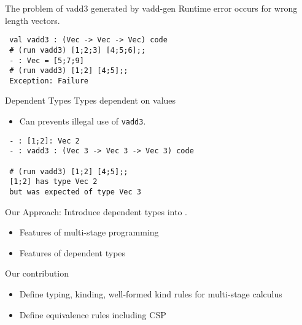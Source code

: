 \documentclass[dvipdfmx,aspectratio=169, 20pt]{beamer}
\begin{document}
\begin{frame}[fragile]{The problem of vadd3 generated by vadd-gen}
    Runtime error occurs for wrong length vectors.
    \begin{verbatim}
 val vadd3 : (Vec -> Vec -> Vec) code
 # (run vadd3) [1;2;3] [4;5;6];;
 - : Vec = [5;7;9]
 # (run vadd3) [1;2] [4;5];;
 Exception: Failure
    \end{verbatim}
    \note{
    }
\end{frame}

\begin{frame}[fragile]{Dependent Types}
    \renewcommand{\V}{\text{Vec}\ }
    Types dependent on values
    \begin{itemize}
        \item Can prevents illegal use of {\verb|vadd3|}.
    \end{itemize}
 \begin{verbatim}
 - : [1;2]: Vec 2
 - : vadd3 : (Vec 3 -> Vec 3 -> Vec 3) code

 # (run vadd3) [1;2] [4;5];;
 [1;2] has type Vec 2
 but was expected of type Vec 3
 \end{verbatim}
\end{frame}


\begin{frame}[fragile]{Our Approach: \LMD}
    Introduce dependent types into .
    \begin{itemize}
        \item Features of multi-stage programming
        \item Features of dependent types
    \end{itemize}
    Our contribution
    \begin{itemize}
        \item Define typing, kinding, well-formed kind rules for multi-stage calculus
        \item Define equivalence rules including CSP
    \end{itemize}
\end{frame}
\end{document}

